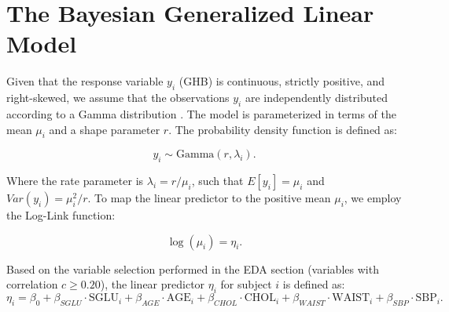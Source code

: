 \section{The Bayesian Generalized Linear Model}
Given that the response variable $y_i$ (GHB) is continuous, strictly positive, and right-skewed, we assume that the observations $y_i$ are independently distributed according to a Gamma distribution \cite{silva2023notes}. The model is parameterized in terms of the mean $\mu_i$ and a shape parameter $r$. The probability density function is defined as: 

\begin{equation*}	
	y_i \sim \text{Gamma}(r, \lambda_i).
\end{equation*}

Where the rate parameter is $\lambda_i = r / \mu_i$, such that $E[y_i] = \mu_i$ and $Var(y_i) = \mu_i^2 / r$. To map the linear predictor to the positive mean $\mu_i$, we employ the Log-Link function: 

\begin{equation*}	
	\log(\mu_i) = \eta_i.
\end{equation*}

Based on the variable selection performed in the EDA section (variables with correlation $c \ge 0.20$), the linear predictor $\eta_i$ for subject $i$ is defined as:
\begin{equation*}
	\eta_i = \beta_0 + \beta_{SGLU} \cdot \text{SGLU}_i + \beta_{AGE} \cdot \text{AGE}_i + \beta_{CHOL} \cdot \text{CHOL}_i + \beta_{WAIST} \cdot \text{WAIST}_i + \beta_{SBP} \cdot \text{SBP}_i.
\end{equation*}

